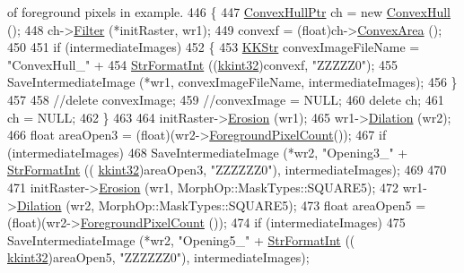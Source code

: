 \begin{DoxyCode}
{       of foreground pixels in example.}
446   \{
447     \hyperlink{class_k_k_b_1_1_convex_hull}{ConvexHullPtr}  ch = \textcolor{keyword}{new} \hyperlink{class_k_k_b_1_1_convex_hull}{ConvexHull} ();
448     ch->\hyperlink{class_k_k_b_1_1_convex_hull_a738c3a3fb1e27c75fd1c5a61bd278cec}{Filter} (*initRaster, wr1);
449     convexf = (float)ch->\hyperlink{class_k_k_b_1_1_convex_hull_a3f6d4a0b84fb968042d1be038d7903ad}{ConvexArea} ();
450 
451     \textcolor{keywordflow}{if}  (intermediateImages)
452     \{
453       \hyperlink{class_k_k_b_1_1_k_k_str}{KKStr} convexImageFileName = \textcolor{stringliteral}{"ConvexHull\_"} +
454                                    \hyperlink{namespace_k_k_b_ae3bde258fa036604fac8bdb0277ab46e}{StrFormatInt} ((\hyperlink{namespace_k_k_b_a8fa4952cc84fda1de4bec1fbdd8d5b1b}{kkint32})convexf, \textcolor{stringliteral}{"ZZZZZ0"});
455       SaveIntermediateImage (*wr1, convexImageFileName, intermediateImages);
456     \}
457 
458     \textcolor{comment}{//delete  convexImage;}
459     \textcolor{comment}{//convexImage = NULL;}
460     \textcolor{keyword}{delete}  ch;
461     ch = NULL;
462   \}
463 
464   initRaster->\hyperlink{class_k_k_b_1_1_raster_a5a019718e60c06c4262e8127232ff19c}{Erosion} (wr1);
465   wr1->\hyperlink{class_k_k_b_1_1_raster_afb263b7cc4ab60bf6745c5166173bbb9}{Dilation} (wr2);
466   \textcolor{keywordtype}{float}  areaOpen3 = (float)(wr2->\hyperlink{class_k_k_b_1_1_raster_a38425a410e40696276be4f22de702eb6}{ForegroundPixelCount}());
467   \textcolor{keywordflow}{if}  (intermediateImages)
468     SaveIntermediateImage (*wr2, \textcolor{stringliteral}{"Opening3\_"} + \hyperlink{namespace_k_k_b_ae3bde258fa036604fac8bdb0277ab46e}{StrFormatInt} ((
      \hyperlink{namespace_k_k_b_a8fa4952cc84fda1de4bec1fbdd8d5b1b}{kkint32})areaOpen3, \textcolor{stringliteral}{"ZZZZZZ0"}), intermediateImages);
469 
470 
471   initRaster->\hyperlink{class_k_k_b_1_1_raster_a5a019718e60c06c4262e8127232ff19c}{Erosion} (wr1, MorphOp::MaskTypes::SQUARE5);
472   wr1->\hyperlink{class_k_k_b_1_1_raster_afb263b7cc4ab60bf6745c5166173bbb9}{Dilation} (wr2, MorphOp::MaskTypes::SQUARE5);
473   \textcolor{keywordtype}{float}  areaOpen5 = (float)(wr2->\hyperlink{class_k_k_b_1_1_raster_a38425a410e40696276be4f22de702eb6}{ForegroundPixelCount} ());
474   \textcolor{keywordflow}{if}  (intermediateImages)
475     SaveIntermediateImage (*wr2, \textcolor{stringliteral}{"Opening5\_"} + \hyperlink{namespace_k_k_b_ae3bde258fa036604fac8bdb0277ab46e}{StrFormatInt} ((
      \hyperlink{namespace_k_k_b_a8fa4952cc84fda1de4bec1fbdd8d5b1b}{kkint32})areaOpen5, \textcolor{stringliteral}{"ZZZZZZ0"}), intermediateImages);

\end{DoxyCode}
